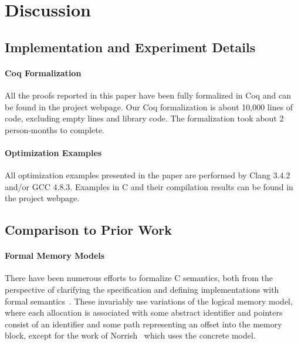\section{Discussion}
\label{sec:intptrcast:discussion}

\subsection{Implementation and Experiment Details}

\paragraph{Coq Formalization}
All the proofs reported in this paper have been fully formalized in
Coq and can be found in the project webpage.  Our Coq formalization is about 10,000 lines of code,
excluding empty lines and library code.  The formalization took about 2
person-months to complete.

\paragraph{Optimization Examples}
All optimization examples presented in the paper are performed by Clang
3.4.2 and/or GCC 4.8.3.  Examples in C and their compilation
results can be found in the project webpage.


\subsection{Comparison to Prior Work}

\paragraph{Formal Memory Models}
There have been numerous efforts to formalize C semantics, both from
the perspective of clarifying the specification and defining
implementations with formal semantics~\cite{norrish1998c,leroy:compcert,ellison2012executable,krebbers2011formalization,Greenaway:2014:DSS:2594291.2594296}. These invariably use
variations of the logical memory model, where each allocation is
associated with some abstract identifier and pointers consist of
an identifier and some path representing an offset into the memory
block, except for the work of Norrish~\cite{norrish1998c} which uses the concrete model.


